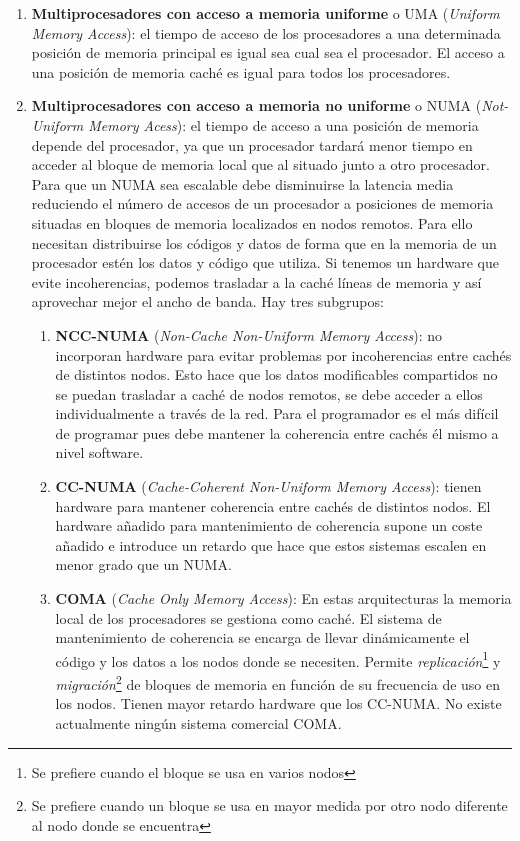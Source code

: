 \documentclass[10pt,a4paper,spanish]{report}
\begin{document}
\begin{enumerate}[\color{azul}{\bf $\heartsuit$}]
\item \textbf{\textcolor[rgb]{0.2,0.4,0.8}{Multiprocesadores con acceso a memoria uniforme}} o UMA (\textit{\textcolor[rgb]{0.2,0.4,0.8}{Uniform Memory Access}}): el tiempo de acceso de los procesadores a una determinada posición de memoria principal es igual sea cual sea el procesador. El acceso a una posición de memoria caché es igual para todos los procesadores.
\item \textbf{\textcolor[rgb]{0.2,0.4,0.8}{Multiprocesadores con acceso a memoria no uniforme}} o NUMA (\textit{\textcolor[rgb]{0.2,0.4,0.8}{Not-Uniform Memory Acess}}): el tiempo de acceso a una posición de memoria depende del procesador, ya que un procesador tardará menor tiempo en acceder al bloque de memoria local que al situado junto a otro procesador. Para que un NUMA sea escalable debe disminuirse la latencia media reduciendo el número de accesos de un procesador a posiciones de memoria situadas en bloques de memoria localizados en nodos remotos. Para ello necesitan distribuirse los códigos y datos de forma que en la memoria de un procesador estén los datos y código que utiliza. Si tenemos un hardware que evite incoherencias, podemos trasladar a la caché líneas de memoria y así aprovechar mejor el ancho de banda. Hay tres subgrupos:
\begin{enumerate}[$\longrightarrow$]
\item \textbf{\textcolor[rgb]{0.2,0.4,0.8}{NCC-NUMA}} (\textit{\textcolor[rgb]{0.2,0.4,0.8}{Non-Cache Non-Uniform Memory Access}}): no incorporan hardware para evitar problemas por incoherencias entre cachés de distintos nodos. Esto hace que los datos modificables compartidos no se puedan trasladar a caché de nodos remotos, se debe acceder a ellos individualmente a través de la red. Para el programador es el más difícil de programar pues debe mantener la coherencia entre cachés él mismo a nivel software. 
\item \textbf{\textcolor[rgb]{0.2,0.4,0.8}{CC-NUMA}} (\textit{\textcolor[rgb]{0.2,0.4,0.8}{Cache-Coherent Non-Uniform Memory Access}}): tienen hardware para mantener coherencia entre cachés de distintos nodos. El hardware añadido para mantenimiento de coherencia supone un coste añadido e introduce un retardo que hace que estos sistemas escalen en menor grado que un NUMA.
\item \textbf{\textcolor[rgb]{0.2,0.4,0.8}{COMA}} (\textit{\textcolor[rgb]{0.2,0.4,0.8}{Cache Only Memory Access}}): En estas arquitecturas la memoria local de los procesadores se gestiona como caché. El sistema de mantenimiento de coherencia se encarga de llevar dinámicamente el código y los datos a los nodos donde se necesiten. Permite \textit{\textcolor[rgb]{0.2,0.4,0.8}{replicación}}\footnote{Se prefiere cuando el bloque se usa en varios nodos} y \textit{\textcolor[rgb]{0.2,0.4,0.8}{migración}}\footnote{Se prefiere cuando un bloque se usa en mayor medida por otro nodo diferente al nodo donde se encuentra} de bloques de memoria en función de su frecuencia de uso en los nodos. Tienen mayor retardo hardware que los CC-NUMA. No existe actualmente ningún sistema comercial COMA.

\end{enumerate}
\end{enumerate}
\end{document}
